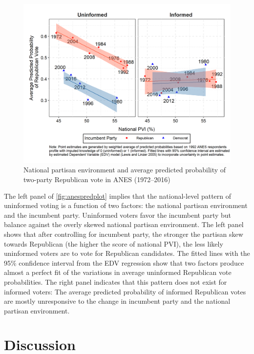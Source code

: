 \documentclass[letterpaper, 12pt]{article}
\begin{document}
    \begin{figure}[t!]
        \caption{National partisan environment and average predicted probability of two-party Republican vote in ANES (1972--2016)}
        \label{fig:anespredplot}
        \includegraphics[width=\linewidth]{../outputs/m1sq_1992_anespredplot.png}
    \end{figure}

    \par The left panel of \autoref{fig:anespredplot} implies that the national-level pattern of uninformed voting is a function of two factors: the national partisan environment and the incumbent party. Uninformed voters favor the incumbent party but balance against the overly skewed national partisan environment. The left panel shows that after controlling for incumbent party, the stronger the partisan skew towards Republican (the higher the score of national PVI), the less likely uninformed voters are to vote for Republican candidates. The fitted lines with the 95\% confidence interval from the EDV regression show that two factors produce almost a perfect fit of the variations in average uninformed Republican vote probabilities. The right panel indicates that this pattern does not exist for informed voters: The average predicted probability of informed Republican votes are mostly unresponsive to the change in incumbent party and the national partisan environment.
    
    \section*{Discussion}
    
\end{document}
